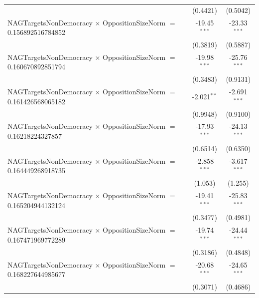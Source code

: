 \begin{tabular}{lcc}
                                                                                & (0.4421)             & (0.5042)\\   
   NAGTargetsNonDemocracy $\times$ OppositionSizeNorm $=$ 0.156892516784852     & -19.45$^{***}$       & -23.33$^{***}$\\   
                                                                                & (0.3819)             & (0.5887)\\   
   NAGTargetsNonDemocracy $\times$ OppositionSizeNorm $=$ 0.160670892851794     & -19.98$^{***}$       & -25.76$^{***}$\\   
                                                                                & (0.3483)             & (0.9131)\\   
   NAGTargetsNonDemocracy $\times$ OppositionSizeNorm $=$ 0.161426568065182     & -2.021$^{**}$        & -2.691$^{***}$\\   
                                                                                & (0.9948)             & (0.9100)\\   
   NAGTargetsNonDemocracy $\times$ OppositionSizeNorm $=$ 0.16218224327857      & -17.93$^{***}$       & -24.13$^{***}$\\   
                                                                                & (0.6514)             & (0.6350)\\   
   NAGTargetsNonDemocracy $\times$ OppositionSizeNorm $=$ 0.164449268918735     & -2.858$^{***}$       & -3.617$^{***}$\\   
                                                                                & (1.053)              & (1.255)\\   
   NAGTargetsNonDemocracy $\times$ OppositionSizeNorm $=$ 0.165204944132124     & -19.41$^{***}$       & -25.83$^{***}$\\   
                                                                                & (0.3477)             & (0.4981)\\   
   NAGTargetsNonDemocracy $\times$ OppositionSizeNorm $=$ 0.167471969772289     & -19.74$^{***}$       & -24.44$^{***}$\\   
                                                                                & (0.3186)             & (0.4848)\\   
   NAGTargetsNonDemocracy $\times$ OppositionSizeNorm $=$ 0.168227644985677     & -20.68$^{***}$       & -24.65$^{***}$\\   
                                                                                & (0.3071)             & (0.4686)\\   

\end{tabular}
